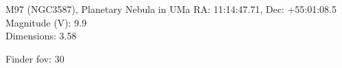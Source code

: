 \begin{block}{M97 (NGC3587), Planetary Nebula in UMa}
    RA: 11:14:47.71, Dec: +55:01:08.5 \\ 
    Magnitude (V): 9.9 \\ 
    Dimensions: 3.58 

    Finder fov: 30 
\end{block}